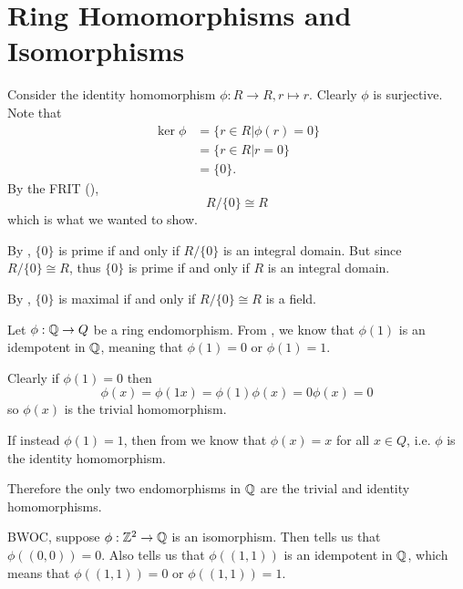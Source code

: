 \section{Ring Homomorphisms and Isomorphisms}
\begin{questions}
    \item \begin{partquestions}{\roman*}
        \item Consider the identity homomorphism $\phi: R \to R, r \mapsto r$. Clearly $\phi$ is surjective. Note that
        \begin{align*}
            \ker\phi &= \{r \in R \vert \phi(r) = 0\}\\
            &= \{r \in R \vert r = 0\}\\
            &= \{0\}.
        \end{align*}
        By the FRIT (),
        \[
            R / \{0\} \cong R
        \]
        which is what we wanted to show.

        \item By , $\{0\}$ is prime if and only if $R/\{0\}$ is an integral domain. But since $R/\{0\} \cong R$, thus $\{0\}$ is prime if and only if $R$ is an integral domain.
        
        \item By , $\{0\}$ is maximal if and only if $R/\{0\} \cong R$ is a field.
    \end{partquestions}

    \item Let $\phi: \mathbb{Q} \to Q$ be a ring endomorphism. From , we know that $\phi(1)$ is an idempotent in $\mathbb{Q}$, meaning that $\phi(1) = 0$ or $\phi(1) = 1$.
    
    Clearly if $\phi(1) = 0$ then
    \[
        \phi(x) = \phi(1x) = \phi(1)\phi(x) = 0\phi(x) = 0
    \]
    so $\phi(x)$ is the trivial homomorphism.
    
    If instead $\phi(1) = 1$, then from  we know that $\phi(x) = x$ for all $x \in Q$, i.e. $\phi$ is the identity homomorphism.

    Therefore the only two endomorphisms in $\mathbb{Q}$ are the trivial and identity homomorphisms.

    \item BWOC, suppose $\phi: \mathbb{Z}^2 \to \mathbb{Q}$ is an isomorphism. Then  tells us that $\phi((0,0)) = 0$. Also  tells us that $\phi((1,1))$ is an idempotent in $\mathbb{Q}$, which means that $\phi((1,1)) = 0$ or $\phi((1,1)) = 1$.
    

\end{questions}
